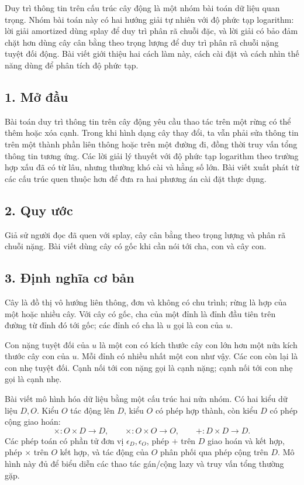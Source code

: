 \documentclass[11pt]{article}
\begin{document}
Duy trì thông tin trên cấu trúc cây động là một nhóm bài toán dữ liệu quan
trọng. Nhóm bài toán này có hai hướng giải tự nhiên với độ phức tạp logarithm:
lời giải amortized dùng splay để duy trì phân rã chuỗi đặc, và lời giải có bảo
đảm chặt hơn dùng cây cân bằng theo trọng lượng để duy trì phân rã chuỗi nặng
tuyệt đối động. Bài viết giới thiệu hai cách làm này, cách cài đặt và cách
nhìn thế năng dùng để phân tích độ phức tạp.

\subsection*{1. Mở đầu}

Bài toán duy trì thông tin trên cây động yêu cầu thao tác trên một rừng có thể
thêm hoặc xóa cạnh. Trong khi hình dạng cây thay đổi, ta vẫn phải sửa thông tin
trên một thành phần liên thông hoặc trên một đường đi, đồng thời truy vấn tổng
thông tin tương ứng. Các lời giải lý thuyết với độ phức tạp logarithm theo
trường hợp xấu đã có từ lâu, nhưng thường khó cài và hằng số lớn. Bài viết
xuất phát từ các cấu trúc quen thuộc hơn để đưa ra hai phương án cài đặt thực
dụng.

\subsection*{2. Quy ước}

Giả sử người đọc đã quen với splay, cây cân bằng theo trọng lượng và phân rã
chuỗi nặng. Bài viết dùng cây có gốc khi cần nói tới cha, con và cây con.

\subsection*{3. Định nghĩa cơ bản}

Cây là đồ thị vô hướng liên thông, đơn và không có chu trình; rừng là hợp của
một hoặc nhiều cây. Với cây có gốc, cha của một đỉnh là đỉnh đầu tiên trên
đường từ đỉnh đó tới gốc; các đỉnh có cha là \(u\) gọi là con của \(u\).

Con nặng tuyệt đối của \(u\) là một con có kích thước cây con lớn hơn một nửa
kích thước cây con của \(u\). Mỗi đỉnh có nhiều nhất một con như vậy. Các con
còn lại là con nhẹ tuyệt đối. Cạnh nối tới con nặng gọi là cạnh nặng; cạnh nối
tới con nhẹ gọi là cạnh nhẹ.

Bài viết mô hình hóa dữ liệu bằng một cấu trúc hai nửa nhóm. Có hai kiểu dữ
liệu \(D,O\). Kiểu \(O\) tác động lên \(D\), kiểu \(O\) có phép hợp thành, còn
kiểu \(D\) có phép cộng giao hoán:
\[
  \times:O\times D\to D,\qquad
  \times:O\times O\to O,\qquad
  +:D\times D\to D.
\]
Các phép toán có phần tử đơn vị \(\epsilon_D,\epsilon_O\), phép \(+\) trên
\(D\) giao hoán và kết hợp, phép \(\times\) trên \(O\) kết hợp, và tác động của
\(O\) phân phối qua phép cộng trên \(D\). Mô hình này đủ để biểu diễn các thao
tác gán/cộng lazy và truy vấn tổng thường gặp.
\end{document}

